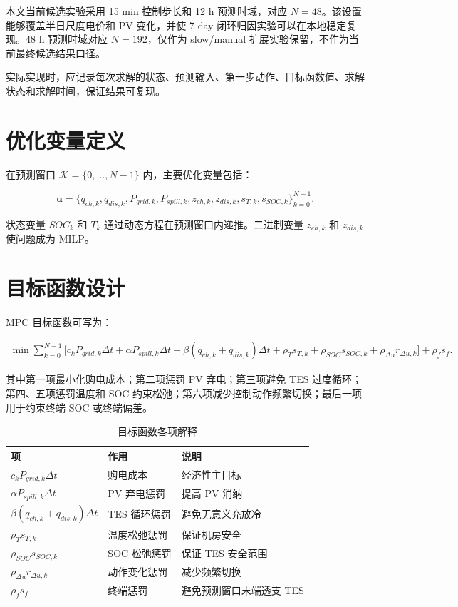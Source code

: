 \documentclass[UTF8,a4paper,12pt]{ctexrep}
\begin{document}
本文当前候选实验采用 15 min 控制步长和 12 h 预测时域，对应 $N=48$。该设置能够覆盖半日尺度电价和 PV 变化，并使 7 day 闭环归因实验可以在本地稳定复现。48 h 预测时域对应 $N=192$，仅作为 slow/manual 扩展实验保留，不作为当前最终候选结果口径。

实际实现时，应记录每次求解的状态、预测输入、第一步动作、目标函数值、求解状态和求解时间，保证结果可复现。

\section{优化变量定义}

在预测窗口 $\mathcal{K}=\{0,\ldots,N-1\}$ 内，主要优化变量包括：

\begin{equation}
  \mathbf{u}
  =
  \{q_{ch,k},q_{dis,k},P_{grid,k},P_{spill,k},z_{ch,k},z_{dis,k},s_{T,k},s_{SOC,k}\}_{k=0}^{N-1}.
\end{equation}

状态变量 $SOC_k$ 和 $T_k$ 通过动态方程在预测窗口内递推。二进制变量 $z_{ch,k}$ 和 $z_{dis,k}$ 使问题成为 MILP。

\section{目标函数设计}

MPC 目标函数可写为：

\begin{align}
  \min \sum_{k=0}^{N-1}
  \Big[
    c_k P_{grid,k}\Delta t
    + \alpha P_{spill,k}\Delta t
    + \beta(q_{ch,k}+q_{dis,k})\Delta t
    + \rho_T s_{T,k}
    + \rho_{SOC}s_{SOC,k}
    + \rho_{\Delta u} r_{\Delta u,k}
  \Big]
  + \rho_f s_f.
  \label{eq:objective}
\end{align}

其中第一项最小化购电成本；第二项惩罚 PV 弃电；第三项避免 TES 过度循环；第四、五项惩罚温度和 SOC 约束松弛；第六项减少控制动作频繁切换；最后一项用于约束终端 SOC 或终端偏差。

\begin{table}[htbp]
  \centering
  \caption{目标函数各项解释}
  \begin{tabular}{lll}
    \toprule
    项 & 作用 & 说明 \\
    \midrule
    $c_kP_{grid,k}\Delta t$ & 购电成本 & 经济性主目标 \\
    $\alpha P_{spill,k}\Delta t$ & PV 弃电惩罚 & 提高 PV 消纳 \\
    $\beta(q_{ch,k}+q_{dis,k})\Delta t$ & TES 循环惩罚 & 避免无意义充放冷 \\
    $\rho_T s_{T,k}$ & 温度松弛惩罚 & 保证机房安全 \\
    $\rho_{SOC}s_{SOC,k}$ & SOC 松弛惩罚 & 保证 TES 安全范围 \\
    $\rho_{\Delta u} r_{\Delta u,k}$ & 动作变化惩罚 & 减少频繁切换 \\
    $\rho_f s_f$ & 终端惩罚 & 避免预测窗口末端透支 TES \\
    \bottomrule
  \end{tabular}
\end{table}
\end{document}
